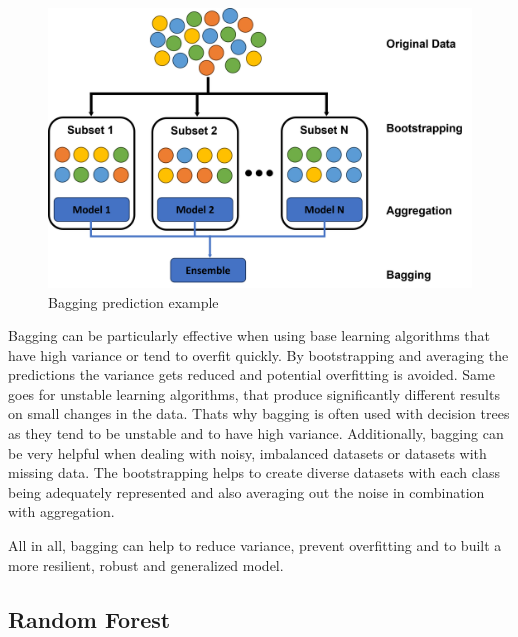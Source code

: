 \begin{figure}[htbp]
    \centering
    \includegraphics[width=.5\textwidth]{figures/bagging_prediction}
    \caption{Bagging prediction example}
\end{figure}


Bagging can be particularly effective when using base learning algorithms
that have high variance or tend to overfit quickly. By bootstrapping and 
averaging the predictions the variance gets reduced and potential overfitting
is avoided.
Same goes for unstable learning algorithms, that produce significantly different
results on small changes in the data. Thats why bagging is often used with decision
trees as they tend to be unstable and to have high variance.
Additionally, bagging can be very helpful when dealing with noisy, imbalanced 
datasets or datasets with missing data. The bootstrapping helps to create 
diverse datasets with each class being adequately represented and also averaging
out the noise in combination with aggregation.


All in all, bagging can help to reduce variance, prevent overfitting and to built
a more resilient, robust and generalized model.

\subsection{Random Forest}


